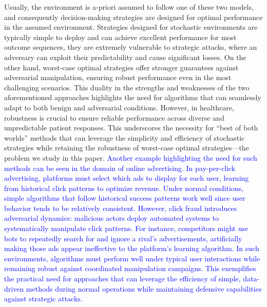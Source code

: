 Usually, the environment is a-priori assumed to follow one of these two models, and consequently decision-making strategies are designed for optimal performance in the assumed environment. Strategies designed for stochastic environments are typically simple to deploy and can achieve excellent performance for most outcome sequences, they are extremely vulnerable to strategic attacks, where an adversary can exploit their predictability and cause significant losses. On the other hand, worst-case optimal strategies offer stronger guarantees against adversarial manipulation, ensuring robust performance even in the most challenging scenarios. This duality in the strengths and weaknesses of the two aforementioned approaches highlights the need for algorithms that can seamlessly adapt to both benign and adversarial conditions. 
However, in healthcare, robustness is crucial to ensure reliable performance across diverse and unpredictable patient responses. This underscores the necessity for “best of both worlds” methods that can leverage the simplicity and efficiency of stochastic strategies while retaining the robustness of worst-case optimal strategies---the problem we study in this paper. \textcolor{blue}{Another example highlighting the need for such methods can be seen in the domain of online advertising. In pay-per-click advertising, platforms must select which ads to display for each user, learning from historical click patterns to optimize revenue. Under normal conditions, simple algorithms that follow historical success patterns work well since user behavior tends to be relatively consistent. However, click fraud introduces adversarial dynamics: malicious actors deploy automated systems to systematically manipulate click patterns. For instance, competitors might use bots to repeatedly search for and ignore a rival's advertisements, artificially making those ads appear ineffective to the platform's learning algorithm. In such environments, algorithms must perform well under typical user interactions while remaining robust against coordinated manipulation campaigns. This exemplifies the practical need for approaches that can leverage the efficiency of simple, data-driven methods during normal operations while maintaining defensive capabilities against strategic attacks.}

